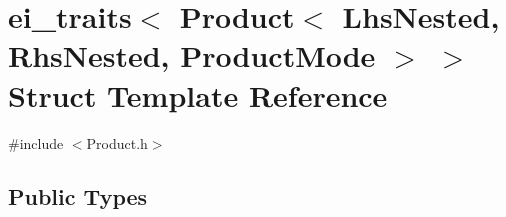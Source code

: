 \hypertarget{structei__traits_3_01_product_3_01_lhs_nested_00_01_rhs_nested_00_01_product_mode_01_4_01_4}{\section{ei\-\_\-traits$<$ Product$<$ Lhs\-Nested, Rhs\-Nested, Product\-Mode $>$ $>$ Struct Template Reference}
\label{structei__traits_3_01_product_3_01_lhs_nested_00_01_rhs_nested_00_01_product_mode_01_4_01_4}
}


{\ttfamily \#include $<$Product.\-h$>$}

\subsection*{Public Types}
